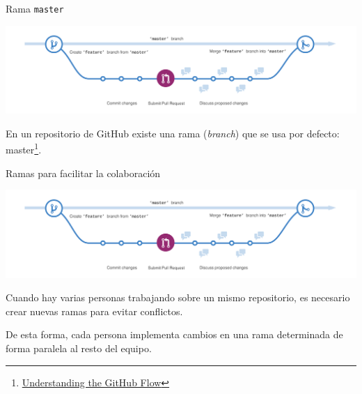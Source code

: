 \documentclass[aspectratio=169, xcolor={usenames,svgnames,dvipsnames}]{beamer}
\begin{document}
\begin{frame}[label={sec:orgebea104},fragile]{Rama \texttt{master}}
 \begin{center}
\includegraphics[width=.9\linewidth]{figs/branching.png}
\end{center}

En un repositorio de GitHub existe una rama (\emph{branch}) que se usa por defecto: \alert{master}\footnote{\href{https://guides.github.com/introduction/flow/}{Understanding the GitHub Flow}}.
\end{frame}

\begin{frame}[label={sec:org080a5bf}]{Ramas para facilitar la colaboración}
\begin{center}
\includegraphics[width=.9\linewidth]{figs/branching.png}
\end{center}

Cuando hay varias personas trabajando sobre un mismo repositorio, es necesario crear nuevas ramas para evitar conflictos. 

De esta forma, cada persona implementa \alert{cambios} en una \alert{rama determinada} de forma paralela al resto del equipo.
\end{frame}
\end{document}
